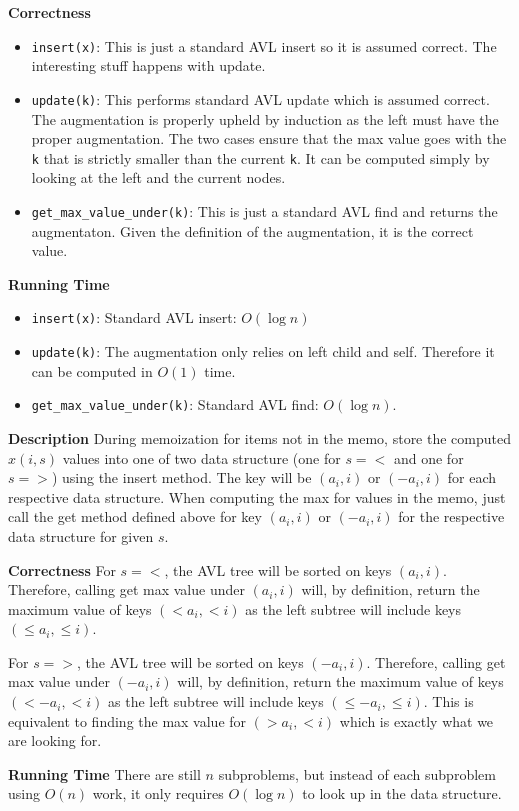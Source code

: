 \documentclass[12pt,twoside]{article}
\begin{document}
\begin{problems}
\begin{problemparts}
{\bf Correctness}
\begin{itemize}
  \item {\tt insert(x)}: This is just a standard AVL insert so it is assumed
  correct. The interesting stuff happens with update.
  \item {\tt update(k)}: This performs standard AVL update which is assumed
  correct. The augmentation is properly upheld by induction as the left must
  have the proper augmentation. The two cases ensure that the max value goes
  with the {\tt k} that is strictly smaller than the current {\tt k}. It can
  be computed simply by looking at the left and the current nodes.
  \item {\tt get\_max\_value\_under(k)}: This is just a standard AVL find and
  returns the augmentaton. Given the definition of the augmentation, it is
  the correct value.
\end{itemize}

{\bf Running Time}
\begin{itemize}
  \item {\tt insert(x)}: Standard AVL insert: $O(\log n)$
  \item {\tt update(k)}: The augmentation only relies on left child and self.
  Therefore it can be computed in $O(1)$ time.
  \item {\tt get\_max\_value\_under(k)}: Standard AVL find: $O(\log n)$.
\end{itemize}

\problempart 

{\bf Description} During memoization for items not in the memo, store the
computed $x(i, s)$ values into one of two data structure (one for $s = <$ and
one for $s = >$) using the insert method. The key will be $(a_i, i)$ or
$(-a_i, i)$ for each respective data structure. When computing the max for
values in the memo, just call the get method defined above for key $(a_i, i)$
or $(-a_i, i)$ for the respective data structure for given $s$.

{\bf Correctness} For $s = <$, the AVL tree will be sorted on keys $(a_i,
i)$. Therefore, calling get max value under $(a_i, i)$ will, by definition,
return the maximum value of keys $(<a_i, <i)$ as the left subtree will
include keys $(\leq a_i, \leq i)$. 

For $s = >$, the AVL tree will be sorted on keys $(-a_i, i)$. Therefore,
calling get max value under $(-a_i, i)$ will, by definition, return the
maximum value of keys $(<-a_i, <i)$ as the left subtree will include keys
$(\leq -a_i, \leq i)$. This is equivalent to finding the max value for
$(>a_i, <i)$ which is exactly what we are looking for.

{\bf Running Time} There are still $n$ subproblems, but instead of each
subproblem using $O(n)$ work, it only requires $O(\log n)$ to look up in the
data structure.

\end{problemparts}

\end{problems}
\end{document}
